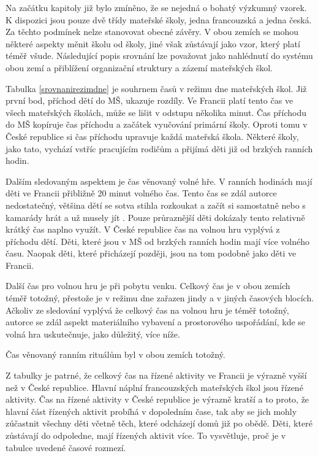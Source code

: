 	Na začátku kapitoly již bylo zmíněno, že se nejedná o bohatý výzkumný vzorek. K dispozici jsou pouze dvě třídy mateřské školy, jedna francouzská a jedna česká. Za těchto podmínek nelze stanovovat obecné závěry. V obou zemích se mohou některé aspekty měnit školu od školy, jiné však zůstávají jako vzor, který platí téměř všude. Následující popis srovnání lze považovat jako nahlédnutí do systému obou zemí a přiblížení organizační struktury a zázemí mateřských škol.


	Tabulka \ref{srovnanirezimdne} je souhrnem časů v režimu dne mateřských škol. Již první bod, příchod dětí do MŠ, ukazuje rozdíly. Ve Francii platí tento čas ve všech mateřských školách, může se lišit v odstupu několika minut. Čas příchodu do MŠ kopíruje čas příchodu a začátek vyučování primární školy. Oproti tomu v České republice si čas příchodu upravuje každá mateřská škola. Některé školy, jako tato, vychází vstříc pracujícím rodičům a přijímá děti již od brzkých ranních hodin.

	Dalším sledovaným aspektem je čas věnovaný volné hře. V ranních hodinách mají děti ve Francii přibližně 20 minut volného čas. Tento čas se zdál autorce nedostatečný, většina dětí se sotva stihla rozkoukat a začít si samostatně nebo s kamarády hrát a už musely jít . Pouze průraznější děti dokázaly tento relativně krátký čas naplno využít.  V České republice čas na volnou hru vyplývá z příchodu dětí. Děti, které jsou v MŠ od brzkých ranních hodin mají více volného času. Naopak děti, které přicházejí později, jsou na tom podobně jako děti ve Francii. 

	Další čas pro volnou hru je při pobytu venku. Celkový čas je v obou zemích téměř totožný, přestože je v režimu dne zařazen jindy a v jiných časových blocích. Ačkoliv ze sledování vyplývá že celkový čas na volnou hru je téměř totožný, autorce se zdál aspekt materiálního vybavení a prostorového uspořádání, kde se volná hra uskutečnuje, jako důležitý, více níže.

	Čas věnovaný ranním rituálům byl v obou zemích totožný. 

	Z tabulky je patrné, že celkový čas na řízené aktivity ve Francii je výrazně vyšší než v České republice. Hlavní náplní francouzských mateřských škol jsou řízené aktivity. Čas na řízené aktivity v České republice je výrazně kratší a to proto, že hlavní část řízených aktivit probíhá v dopoledním čase, tak aby se jich mohly zúčastnit všechny děti včetně těch, které odcházejí domů již po obědě. Děti, které zůstávají do odpoledne, mají řízených aktivit více. To vysvětluje, proč je v tabulce uvedené časové rozmezí.

